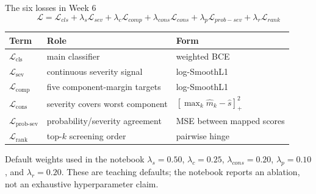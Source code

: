 \documentclass[aspectratio=169,10pt]{beamer}
\begin{document}
\begin{frame}{The six losses in Week 6}
\begin{equation*}
\mathcal{L}=\mathcal{L}_{cls}+\lambda_s\mathcal{L}_{sev}+\lambda_c\mathcal{L}_{comp}
+\lambda_{cons}\mathcal{L}_{cons}+\lambda_p\mathcal{L}_{prob-sev}+\lambda_r\mathcal{L}_{rank}
\end{equation*}
\vspace{0.3em}
\centering
\small
\begin{tabular}{lll}
\toprule
Term & Role & Form \\
\midrule
$\mathcal{L}_{\text{cls}}$ & main classifier & weighted BCE \\
$\mathcal{L}_{\text{sev}}$ & continuous severity signal & log-SmoothL1 \\
$\mathcal{L}_{\text{comp}}$ & five component-margin targets & log-SmoothL1 \\
$\mathcal{L}_{\text{cons}}$ & severity covers worst component & $[\max_k\hat m_k-\hat s]_+^2$ \\
$\mathcal{L}_{\text{prob-sev}}$ & probability/severity agreement & MSE between mapped scores \\
$\mathcal{L}_{\text{rank}}$ & top-$k$ screening order & pairwise hinge \\
\bottomrule
\end{tabular}
\vspace{0.6em}
\begin{block}{Default weights used in the notebook}
$\lambda_s=0.50$, $\lambda_c=0.25$, $\lambda_{cons}=0.20$, $\lambda_p=0.10$, and $\lambda_r=0.20$. These are teaching defaults; the notebook reports an ablation, not an exhaustive hyperparameter claim.
\end{block}
\end{frame}
\end{document}
